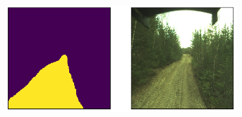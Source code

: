 \documentclass[USenglish]{ifimaster}  %
\begin{document}
\begin{appendices}
\begin{figure}[ht]
\hfill
\begin{subfigure}[b]{\textwidth}
\centering
\includegraphics[width=0.95\textwidth]{bilder/appendix_1/2017-05-09-13-26-47-00311.png}
\end{subfigure}
\end{figure}


\end{appendices}
\end{document}
